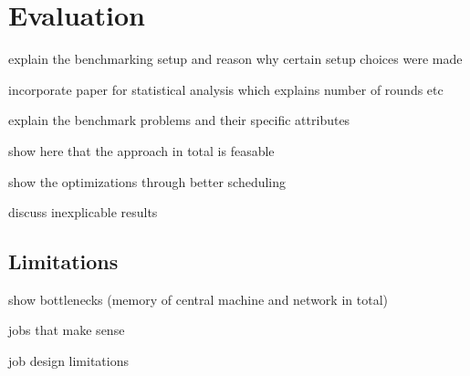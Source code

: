 \chapter{Evaluation}



explain the benchmarking setup and reason why certain setup choices were made

incorporate paper for statistical analysis which explains number of rounds etc

explain the benchmark problems and their specific attributes

show here that the approach in total is feasable

show the optimizations through better scheduling

discuss inexplicable results



\section{Limitations}

show bottlenecks (memory of central machine and network in total)

jobs that make sense

job design limitations